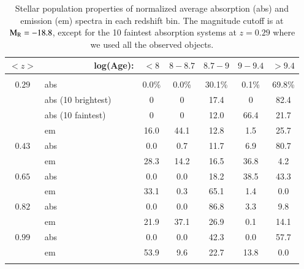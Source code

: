 \documentclass[referee]{aa}
\begin{document}
\begin{table}
\renewcommand{\arraystretch}{0.9}
\centering 
\caption{Stellar population properties of normalized average absorption (abs) and emission (em) spectra in
each redshift bin. The magnitude cutoff is at $\rm M_R = -18.8$, except for the 10 faintest absorption systems at $ z = 0.29$ where
we used all the observed objects.}
\begin{tabular}{ c l c c c c c}
  $<z>$   &  \ \ \ \ \ \ \ \ \ \ log(Age):  &    $<8$  & $8-8.7$ & $8.7-9$ & $9-9.4$& $>9.4$\\ \hline
& & & & & & \\
$0.29$            & abs            	&  0.0\%        & 0.0\%    	&  30.1\%       &  0.1\%  	&  69.8\% \\
         		& abs (10 brightest)    &  0        	& 0      	&  17.4   	&  0    	&  82.4 \\
         		& abs (10 faintest)  	&  0        	& 0      	&  12.0   	&  66.4 	&  21.7 \\
                	& em             	&  16.0    	& 44.1  	&  12.8   	&  1.5  	&  25.7  \\
$0.43$         & abs                   &  0.0          & 0.7           &  11.7         &  6.9          &  80.7 \\
                        & em                    &  28.3         & 14.2          &  16.5         &  36.8         & 4.2  \\
 $0.65$           & abs                   &  0.0          &  0.0          & 18.2          & 38.5          & 43.3 \\
                        & em                    &  33.1         &  0.3          & 65.1          & 1.4           &  0.0  \\
 $0.82$          & abs                   &   0.0         &  0.0          & 86.8          &  3.3          &  9.8\\
                        & em                    &  21.9         & 37.1          & 26.9          & 0.1           & 14.1  \\
 $0.99$          & abs                   &  0.0          & 0.0           & 42.3          & 0.0           & 57.7 \\
                        & em                    &  53.9         & 9.6           & 22.7          & 13.8          & 0.0  \\

\hline \hline
\label{poptable}
\end{tabular}
\end{table}
\end{document}
